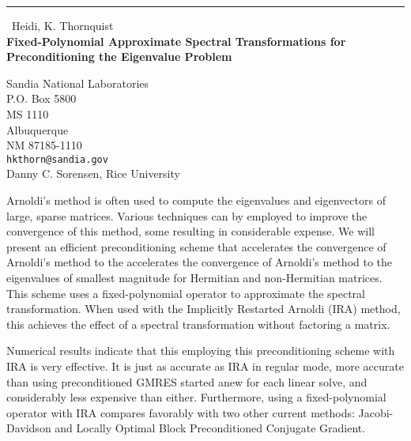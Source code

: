 \documentclass{report}
\begin{document}
\begin{center}
\rule{6in}{1pt} \
{\large Heidi, K. Thornquist \\
{\bf Fixed-Polynomial Approximate Spectral Transformations for Preconditioning the Eigenvalue Problem}}

Sandia National Laboratories \\ P.O. Box 5800 \\ MS 1110 \\ Albuquerque \\ NM  87185-1110
\\
{\tt hkthorn@sandia.gov}\\
	Danny C. Sorensen,
	Rice University\end{center}

Arnoldi's method is often used to compute the eigenvalues
and eigenvectors of large, sparse matrices. Various
techniques can by employed to improve the convergence of
this method, some resulting in considerable expense.
We will present an efficient preconditioning scheme that
accelerates the convergence of Arnoldi's method to the
accelerates the convergence of Arnoldi's method to the
eigenvalues of smallest magnitude for Hermitian and
non-Hermitian matrices. This scheme uses a fixed-polynomial
operator to approximate the spectral transformation.
When used with the Implicitly Restarted Arnoldi (IRA) method,
this achieves the effect of a spectral transformation without
factoring a matrix.

Numerical results indicate that this employing this
preconditioning scheme with IRA is very effective. It
is just as accurate as IRA in regular mode, more accurate
than using preconditioned GMRES started anew for each
linear solve, and considerably less expensive than either.
Furthermore, using a fixed-polynomial operator with IRA
compares favorably with two other current methods:
Jacobi-Davidson and Locally Optimal Block Preconditioned
Conjugate Gradient.
\end{document}

